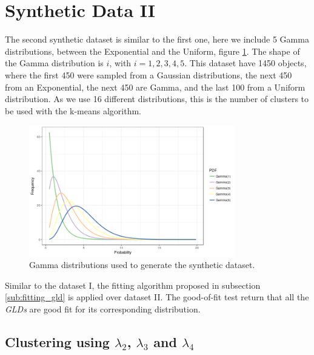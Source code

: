 
\section{Synthetic Data II}\label{sec:synthetic_II}
The second synthetic dataset is similar to the first one, here we include 5 Gamma distributions, between the Exponential and the Uniform, figure \ref{fig:5_gamma}. The shape of the Gamma distribution is $i$, with $i=1, 2, 3, 4, 5$. This dataset have 1450 objects, where the first 450 were sampled from a Gaussian distributions, the next 450 from an Exponential, the next 450 are Gamma, and the last 100 from a Uniform distribution. As we use 16 different distributions, this is the number of clusters to be used with the k-means algorithm. 

\begin{figure}[H]
    \centering
    \includegraphics[width=0.8\textwidth]{img/gld_clustering/extra_images/5_gamma.png}
    \caption{Gamma distributions used to generate the synthetic dataset.}
    \label{fig:5_gamma}
\end{figure}

Similar to the dataset I, the fitting algorithm proposed in subsection \ref{sub:fitting_gld} is applied over dataset II. The good-of-fit test return that all the \textit{GLDs} are good fit for its corresponding distribution.

\subsection{Clustering using $\lambda_{2}$, $\lambda_{3}$ and $\lambda_{4}$}\label{syntheticII_l234}

